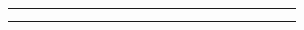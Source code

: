 \begin{landscape}
\begin{table}[h!]
\begin{tabular}{lcllcllcllcllcllcl}
\multicolumn{1}{l|}{}     & \multicolumn{1}{c|}{}                                                                                                   &                              & \multicolumn{1}{l|}{}   & \multicolumn{1}{c|}{}                                                                                                      &                               & \multicolumn{1}{l|}{}   & \multicolumn{1}{c|}{}                                                                                                   &                               & \multicolumn{1}{l|}{}   & \multicolumn{1}{c|}{}                                                                                            &                               & \multicolumn{1}{l|}{}   & \multicolumn{1}{c|}{}                                                                                                              &                               & \multicolumn{1}{l|}{}   & \multicolumn{1}{c|}{}                                                                                                        &                               \\
\multicolumn{1}{l|}{}     & \multicolumn{1}{c|}{}                                                                                                   &                              & \multicolumn{1}{l|}{}   & \multicolumn{1}{c|}{}                                                                                                      &                               & \multicolumn{1}{l|}{}   & \multicolumn{1}{c|}{}                                                                                                   &                               & \multicolumn{1}{l|}{}   & \multicolumn{1}{c|}{}                                                                                            &                               & \multicolumn{1}{l|}{}   & \multicolumn{1}{c|}{}                                                                                                              &                               & \multicolumn{1}{l|}{}   & \multicolumn{1}{c|}{}                                                                                                        &                               \\ \cline{1-1} \cline{3-4} \cline{6-7} \cline{9-10} \cline{12-13} \cline{15-16} \cline{18-18} 

\end{tabular}
\end{table}
\end{landscape}
